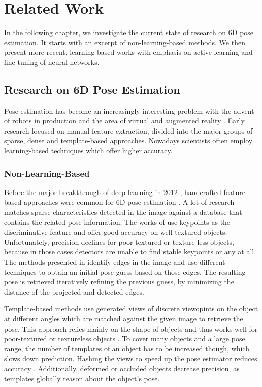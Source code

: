 \chapter{Related Work} \label{chapter:related_work}

In the following chapter, we investigate the current state of research on 6D pose estimation. It starts with an excerpt of non-learning-based methods. We then present more recent, learning-based works with emphasis on active learning and fine-tuning of neural networks.

\section{Research on 6D Pose Estimation}

Pose estimation has become an increasingly interesting problem with the advent of robots in production and the area of virtual and augmented reality \cite{bb8}. Early research focused on manual feature extraction, divided into the major groups of sparse, dense and template-based approaches. Nowadays scientists often employ learning-based techniques which offer higher accuracy.

\subsection{Non-Learning-Based}

Before the major breakthrough of deep learning in 2012 \cite{alexnet}, handcrafted feature-based approaches were common for 6D pose estimation \cite{ylecun}. A lot of research matches sparse characteristics detected in the image against a database that contains the related pose information. The works of \cite{dglowe1, dwagner} use keypoints as the discriminative feature and offer good accuracy on well-textured objects. Unfortunately, precision declines for poor-textured or texture-less objects, because in those cases detectors are unable to find stable keypoints or any at all. The methods presented in \cite{gklein,dglowe2,charris} identify edges in the image and use different techniques to obtain an initial pose guess based on those edges. The resulting pose is retrieved iteratively refining the previous guess, by minimizing the distance of the projected and detected edges.

Template-based methods \cite{hinterstoisser1, hinterstoisser2, rioscabrera, csteger} use generated views of discrete viewopints on the object at different angles which are matched against the given image to retrieve the pose. This approach relies mainly on the shape of objects and thus works well for poor-textured or textureless objects \cite{pertsch}. To cover many objects and a large pose range, the number of templates of an object has to be increased though, which slows down prediction. Hashing the views to speed up the pose estimator reduces accuracy \cite{zhou}. Additionally, deformed or occluded objects decrease precision, as templates globally reason about the object's pose.

